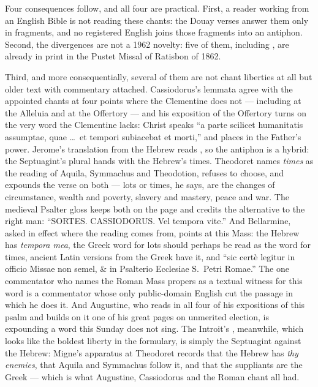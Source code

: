 Four consequences follow, and all four are practical. First, a reader working
from an English Bible is not reading these chants: the Douay verses answer
them only in fragments, and no registered English joins those fragments into
an antiphon. Second, the divergences are not a
1962 novelty: five of them, including , are already in print
in the Pustet Missal of Ratisbon of 1862.

Third, and more consequentially, several of them are not chant liberties at all
but older text with commentary attached. Cassiodorus's lemmata agree with the
appointed chants at four points where the Clementine does not --- including
 at the Alleluia and  at the Offertory --- and his exposition of the Offertory turns on
the very word the Clementine lacks: Christ speaks ``a parte scilicet humanitatis
assumptae, quae \dots\ et tempori subiacebat et morti,'' and places
 in the Father's power. Jerome's translation from the
Hebrew reads , so the antiphon is a hybrid: the
Septuagint's plural hands with the Hebrew's times. Theodoret names
\textit{times} as the reading of Aquila, Symmachus and Theodotion, refuses to
choose, and expounds the verse on both --- lots or times, he says, are the
changes of circumstance, wealth and poverty, slavery and mastery, peace and
war. The medieval Psalter gloss keeps both on the page and credits the
alternative to the right man: ``SORTES. CASSIODORUS. Vel tempora vite.'' And
Bellarmine, asked in effect where the reading comes from, points at this Mass:
the Hebrew has \textit{tempora mea}, the Greek word for lots should perhaps be
read as the word for times, ancient Latin versions from the Greek have it, and
``sic certè legitur in officio Missae non semel, \& in Psalterio Ecclesiae S.\
Petri Romae.'' The one commentator who names the Roman Mass propers as a
textual witness for this word is a commentator whose only public-domain English
cut the passage in which he does it. And Augustine, who reads \latin{sortes} in all four of his expositions of
this psalm and builds on it one of his great pages on unmerited election, is
expounding a word this Sunday does not sing. The Introit's \latin{voces
quæréntium te}, meanwhile, which looks like the boldest liberty in the
formulary, is simply the Septuagint against the Hebrew: Migne's apparatus at
Theodoret records that the Hebrew has \textit{thy enemies}, that Aquila and
Symmachus follow it, and that the suppliants are the Greek --- which is what
Augustine, Cassiodorus and the Roman chant all had.

